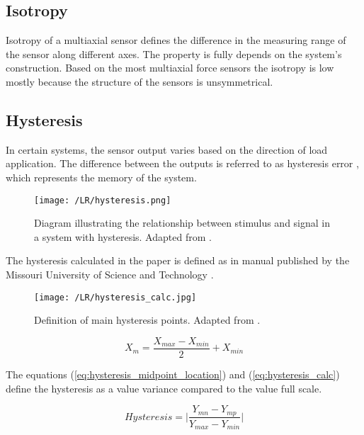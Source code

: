 \subsection{Isotropy}
Isotropy of a multiaxial sensor defines the difference in the measuring range of the sensor along different axes. The property is fully depends on the system's construction. 
Based on the \cite[Tab. 2, 3, 4]{multi_axis_force_sensors_review} most multiaxial force sensors the isotropy is low mostly because the structure of the sensors is unsymmetrical.

\subsection{Hysteresis}

In certain systems, the sensor output varies based on the direction of load application. 
The difference between the outputs is referred to as hysteresis error \cite{handbook_sensors}, which represents the memory of the system.
\begin{figure}[H]
    \centering
    \texttt{[image: /LR/hysteresis.png]}
    \caption{Diagram illustrating the relationship between stimulus and signal in a system with hysteresis. Adapted from \cite[Fig. 2.11]{handbook_sensors}.}
    \label{fig:hysteresis}
\end{figure}


The hysteresis calculated in the paper is defined as in manual published by the Missouri University of Science and Technology \cite{hysteresis_calc}.
\begin{figure}[H]
    \centering
    \texttt{[image: /LR/hysteresis\_calc.jpg]}
    \caption{Definition of main hysteresis points. Adapted from \cite[Fig. 3]{hysteresis_calc}.}
    \label{fig:hysteresis_calc}
\end{figure}
\begin{equation}
    X_m = \frac{X_{max} - X_{min}}{2} + X_{min}
    \label{eq:hysteresis_midpoint_location}
\end{equation}

The equations (\ref{eq:hysteresis_midpoint_location}) and (\ref*{eq:hysteresis_calc}) define the hysteresis as a value variance compared to the value full scale.  

\begin{equation}
    \textit{Hysteresis} = \big| \frac{Y_{mn} - Y_{mp}}{Y_{max} - Y_{min}} \big|
    \label{eq:hysteresis_calc}
\end{equation}
